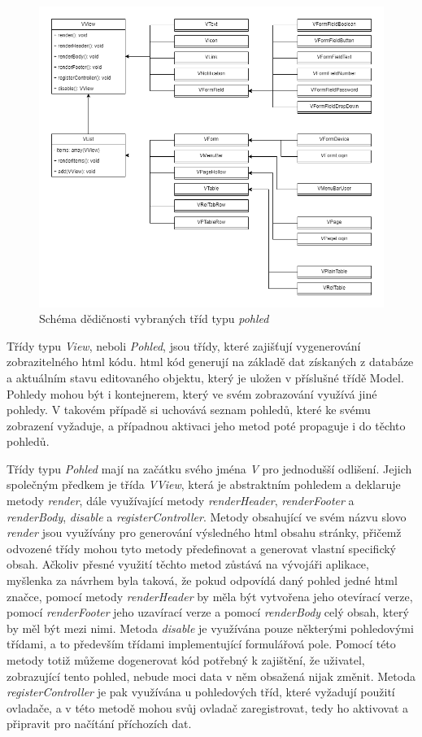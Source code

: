 \begin{figure}[h!]
    \centering
    \includegraphics[width=1\textwidth]{images/view-tridy.png}
    \caption{Schéma dědičnosti vybraných tříd typu \emph{pohled}}
    \label{viewClasses}
\end{figure}

Třídy typu \emph{View}, neboli \emph{Pohled}, jsou třídy, které zajišťují vygenerování zobrazitelného \acrshort{html} kódu. \acrshort{html} kód generují na základě dat získaných z databáze a aktuálním stavu editovaného objektu, který je uložen v příslušné třídě Model. Pohledy mohou být i kontejnerem, který ve svém zobrazování využívá jiné pohledy. V takovém případě si uchovává seznam pohledů, které ke svému zobrazení vyžaduje, a případnou aktivaci jeho metod poté propaguje i do těchto pohledů. 

Třídy typu \emph{Pohled} mají na začátku svého jména \emph{V} pro jednodušší odlišení. Jejich společným předkem je třída \emph{VView}, která je abstraktním pohledem a deklaruje metody \emph{render}, dále využívající metody \emph{renderHeader}, \emph{renderFooter} a \emph{renderBody}, \emph{disable} a \emph{registerController}. Metody obsahující ve svém názvu slovo \emph{render} jsou využívány pro generování výsledného \acrshort{html} obsahu stránky, přičemž odvozené třídy mohou tyto metody předefinovat a generovat vlastní specifický obsah. Ačkoliv přesné využití těchto metod zůstává na vývojáři aplikace, myšlenka za návrhem byla taková, že pokud odpovídá daný pohled jedné \acrshort{html} značce, pomocí metody \emph{renderHeader} by měla být vytvořena jeho otevírací verze, pomocí \emph{renderFooter} jeho uzavírací verze a pomocí \emph{renderBody} celý obsah, který by měl být mezi nimi. Metoda \emph{disable} je využívána pouze některými pohledovými třídami, a to především třídami implementující formulářová pole. Pomocí této metody totiž můžeme dogenerovat kód potřebný k zajištění, že uživatel, zobrazující tento pohled, nebude moci data v něm obsažená nijak změnit. Metoda \emph{registerController} je pak využívána u pohledových tříd, které vyžadují použití ovladače, a v této metodě mohou svůj ovladač zaregistrovat, tedy ho aktivovat a připravit pro načítání příchozích dat. 

